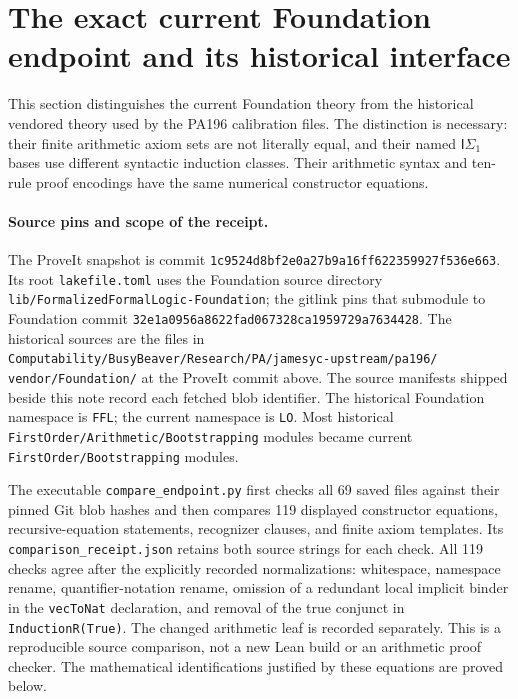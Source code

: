 \section{The exact current Foundation endpoint and its historical interface}
\label{sec:foundation-endpoint-comparison}

This section distinguishes the current Foundation theory from the
historical vendored theory used by the PA196 calibration files.  The
distinction is necessary: their finite arithmetic axiom sets are not
literally equal, and their named $\mathsf I\Sigma _1$ bases use different
syntactic induction classes.  Their arithmetic syntax and ten-rule
proof encodings have the same numerical constructor equations.

\paragraph{Source pins and scope of the receipt.}
The ProveIt snapshot is commit
\texttt{1c9524d8bf2e0a27b9a16ff622359927f536e663}.
Its root \texttt{lakefile.toml} uses the Foundation source directory
\texttt{lib/FormalizedFormalLogic-Foundation}; the gitlink pins that
submodule to Foundation commit
\texttt{32e1a0956a8622fad067328ca1959729a7634428}.
The historical sources are the files in
\texttt{Computability/BusyBeaver/Research/PA/jamesyc-upstream/pa196/}
\texttt{vendor/Foundation/} at the ProveIt commit above.
The source manifests shipped beside this note record each fetched
blob identifier.  The historical Foundation namespace is
\texttt{FFL}; the current namespace is \texttt{LO}.  Most historical
\texttt{FirstOrder/Arithmetic/Bootstrapping} modules became current
\texttt{FirstOrder/Bootstrapping} modules.

The executable \texttt{compare\_endpoint.py} first checks all 69 saved
files against their pinned Git blob hashes and then compares 119 displayed
constructor equations, recursive-equation statements, recognizer
clauses, and finite axiom templates.  Its
\texttt{comparison\_receipt.json} retains both source strings for
each check.  All 119 checks agree after the explicitly recorded
normalizations: whitespace, namespace rename, quantifier-notation
rename, omission of a redundant local implicit binder in the
\texttt{vecToNat} declaration, and removal of the true conjunct
in \texttt{InductionR(True)}.  The changed arithmetic leaf is
recorded separately.  This is a reproducible source comparison,
not a new Lean build or an arithmetic proof checker.  The mathematical
identifications justified by these equations are proved below.


